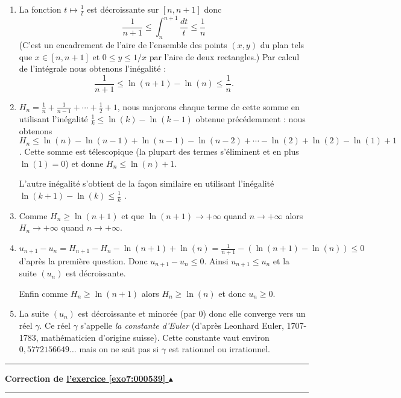 \documentclass[11pt,a4paper]{article}
\newcounter{exo}
\newcommand{\correction}[1]{\hypertarget{cor7:#1}{}\label{cor7:#1}{\bf Correction de \hyperlink{exo7:#1}{l'exercice \ref{exo7:#1} $\blacktriangle$}}\vspace{1mm}\hrule\vspace{1mm}}
\newcommand{\fincorrection}{\vspace{1mm}\hrule\vspace*{7mm}}
\begin{document}
\begin{enumerate}
\item La fonction $t \mapsto \frac 1 t$ est d\'ecroissante
sur $[n,n+1]$ donc
$$\frac{1}{n+1} \leqslant \int_n^{n+1} \frac{dt}{t} \leqslant \frac 1n$$
(C'est un encadrement de l'aire de l'ensemble des points $(x,y)$
du plan tels que $x\in[n,n+1]$ et $0\leqslant y\leqslant 1/x$ par l'aire de
deux rectangles.) Par calcul de l'intégrale nous obtenons l'in\'egalit\'e :
$$\frac{1}{n+1} \leqslant \ln(n+1)-\ln(n)  \leqslant \frac 1n.$$
\item $H_n = \frac1n+\frac{1}{n-1}+\cdots +\frac12+1$, nous majorons chaque terme de cette somme en utilisant l'in\'egalit\'e $\frac1k \leqslant \ln(k)-\ln (k-1)$ obtenue pr\'ec\'edemment : nous obtenons
$H_n \leqslant \ln(n)-\ln (n-1) + \ln(n-1)-\ln (n-2)+\cdots-\ln(2) +\ln (2) - \ln
(1) + 1$. Cette somme est t\'elescopique (la plupart des termes
s'\'eliminent et en plus $\ln (1) =0$) et donne $H_n \leqslant \ln (n) + 1$.

L'autre in\'egalit\'e  s'obtient de la fa\c{c}on similaire en
utilisant l'in\'egalit\'e $ \ln(k+1)-\ln(k) \leqslant \frac{1}{k}$ .
\item Comme $H_n \geqslant \ln (n+1)$ et que $\ln(n+1) \rightarrow +\infty$ quand $n\rightarrow +\infty$ alors $H_n \rightarrow +\infty$ quand $n\rightarrow +\infty$.
\item $u_{n+1}-u_n = H_{n+1}-H_n - \ln(n+1)+\ln(n) = \frac{1}{n+1}-(\ln (n+1)-\ln (n))\leqslant 0$ d'apr\`es la premi\`ere question. Donc $u_{n+1}-u_n  \leqslant 0$. Ainsi $u_{n+1} \leqslant u_n$ et la suite
$(u_n)$ est d\'ecroissante.

Enfin comme $H_n \geqslant \ln(n+1)$ alors $H_n \geqslant \ln (n)$ et donc
$u_n\geqslant 0$.
\item La suite $(u_n)$ est d\'ecroissante et minor\'ee (par $0$) donc elle converge
vers un r\'eel $\gamma$. Ce r\'eel $\gamma$ s'appelle \emph{la constante d'Euler}
(d'après Leonhard Euler, 1707-1783, math\'ematicien d'origine suisse). Cette
constante vaut environ $0,5772156649\ldots$ mais on ne sait pas si
$\gamma$ est rationnel ou irrationnel.
\end{enumerate}
\fincorrection
\correction{000539}
\end{document}
